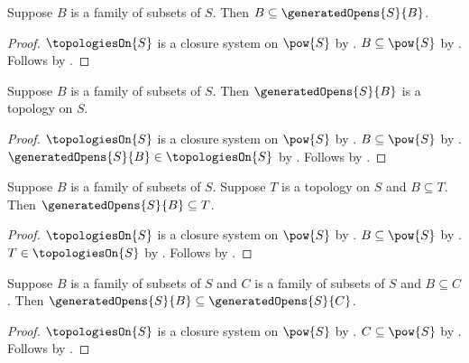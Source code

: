 \begin{proposition}\label{generated_opens_contains}
    Suppose $B$ is a family of subsets of $S$.
    Then $B\subseteq\generatedOpens{S}{B}$.
\end{proposition}
\begin{proof}
    $\topologiesOn{S}$ is a closure system on $\pow{S}$ by
        .
    $B\subseteq\pow{S}$ by .
    Follows by .
\end{proof}

\begin{classification}\label{generated_opens_is_topology}
    Suppose $B$ is a family of subsets of $S$.
    Then $\generatedOpens{S}{B}$ is a topology on $S$.
\end{classification}
\begin{proof}
    $\topologiesOn{S}$ is a closure system on $\pow{S}$ by
        .
    $B\subseteq\pow{S}$ by .
    $\generatedOpens{S}{B}\in\topologiesOn{S}$ by
        .
    Follows by .
\end{proof}

\begin{theorem}\label{generated_opens_least}
    Suppose $B$ is a family of subsets of $S$.
    Suppose $T$ is a topology on $S$ and $B\subseteq T$.
    Then $\generatedOpens{S}{B}\subseteq T$.
\end{theorem}
\begin{proof}
    $\topologiesOn{S}$ is a closure system on $\pow{S}$ by
        .
    $B\subseteq\pow{S}$ by .
    $T\in\topologiesOn{S}$ by .
    Follows by .
\end{proof}

\begin{proposition}\label{generated_opens_monotone}
    Suppose $B$ is a family of subsets of $S$ and
        $C$ is a family of subsets of $S$ and $B\subseteq C$.
    Then $\generatedOpens{S}{B}\subseteq\generatedOpens{S}{C}$.
\end{proposition}
\begin{proof}
    $\topologiesOn{S}$ is a closure system on $\pow{S}$ by
        .
    $C\subseteq\pow{S}$ by .
    Follows by .
\end{proof}

